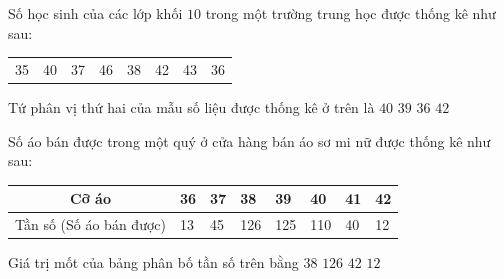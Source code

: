 \begin{ex}%
Số học sinh của các lớp khối $10$ trong một trường trung học được thống kê như sau:\begin{center}
\begin{tabular}{cccccccc}
35 & 40 & 37 & 46 & 38 & 42 & 43 & 36
\end{tabular}
\end{center}  Tứ phân vị thứ hai của mẫu số liệu được thống kê ở trên là
\choice
{$40$}
{\True $39$}
{$36$}
{$42$}
\end{ex}

\begin{ex}%
Số áo bán được trong một quý ở cửa hàng bán áo sơ mi nữ được thống kê như sau:
\begin{center}
\begin{tabular}{|c|l|l|l|l|l|l|l|}
\hline Cỡ áo & 36 & 37 & 38 & 39 & 40 & 41 & 42 \\
\hline 
Tần số 
(Số áo bán được)
& 13 & 45 & 126 & 125 & 110 & 40 & 12 \\
\hline
\end{tabular}
\end{center}
Giá trị mốt của bảng phân bố tần số trên bằng
\choice
{\True $38$}
{$126$}
{$42$}
{$12$}
\end{ex}

